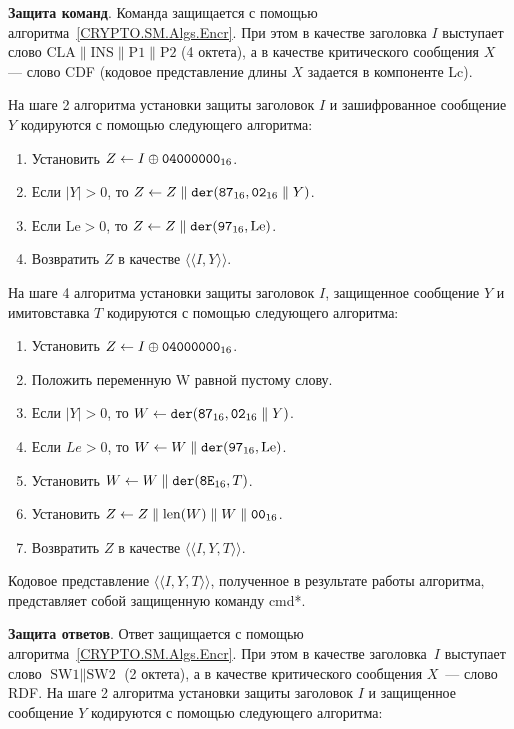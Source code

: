 {\bf Защита команд}. 
Команда защищается с помощью алгоритма~\ref{CRYPTO.SM.Algs.Encr}. 
При этом в 
качестве заголовка $I$ выступает слово 
$\text{CLA} \parallel \text{INS} \parallel \text{P1} \parallel \text{P2}$ 
(4 октета), а 
в качестве критического сообщения $X$ --- слово CDF (кодовое представление 
длины $X$ задается в компоненте Lc). 

На шаге 2 алгоритма установки защиты заголовок $I$ и зашифрованное сообщение 
$Y$ кодируются с помощью следующего алгоритма: 

\begin{enumerate}
\item
Установить $Z \gets I\oplus\texttt{04000000}_{16}$.
\item
Если $|Y| > 0$, то $Z \gets Z\parallel\texttt{der}(\texttt{87}_{16},\texttt{02}_{16}\parallel Y)$.
\item
Если $\text{Le} > 0$, то $Z\gets Z\parallel\texttt{der}(\texttt{97}_{16}, \text{Le})$.
\item
Возвратить $Z$ в качестве $\langle\langle I, Y\rangle\rangle$.
\end{enumerate}

На шаге 4 алгоритма установки защиты заголовок $I$, защищенное сообщение $Y$ и 
имитовставка $T$ кодируются с помощью следующего алгоритма: 
\begin{enumerate}
\item
Установить $Z\gets I\oplus\texttt{04000000}_{16}$.
\item
Положить переменную W равной пустому слову.
\item
Если $|Y| > 0$, то $W\gets \texttt{der}(\texttt{87}_{16}, \texttt{02}_{16}\parallel Y)$.
\item
Если $Le > 0$, то $W\gets W\parallel\texttt{der}(\texttt{97}_{16}, \text{Le})$.
\item
Установить $W\gets W\parallel\texttt{der}(\texttt{8E}_{16}, T)$.
\item
Установить $Z\gets Z\parallel\text{len}(W)\parallel W\parallel\texttt{00}_{16}$.
\item
Возвратить $Z$ в качестве $\langle\langle I, Y, T\rangle\rangle$.
\end{enumerate}

Кодовое представление $\langle\langle I, Y, T\rangle\rangle$, полученное 
в результате работы алгоритма, представляет собой защищенную команду cmd*. 

{\bf Защита ответов}. 
Ответ защищается с помощью алгоритма~\ref{CRYPTO.SM.Algs.Encr}. При этом в 
качестве заголовка~$I$ выступает слово $\text{SW1} \parallel\text{SW2}$ 
(2 октета), а в качестве критического сообщения $X$~--- слово RDF. 
На шаге 2 алгоритма установки защиты заголовок $I$ и защищенное сообщение $Y$ 
кодируются с помощью следующего алгоритма: 


